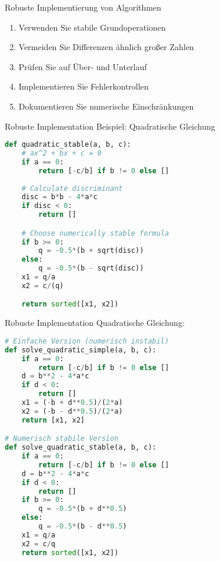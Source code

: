 \begin{KR}{Robuste Implementierung von Algorithmen}
\begin{enumerate}
    \item Verwenden Sie stabile Grundoperationen
    \item Vermeiden Sie Differenzen ähnlich großer Zahlen
    \item Prüfen Sie auf Über- und Unterlauf
    \item Implementieren Sie Fehlerkontrollen
    \item Dokumentieren Sie numerische Einschränkungen
\end{enumerate}
\end{KR}

\begin{examplecode}{Robuste Implementation} Beispiel: Quadratische Gleichung
\begin{lstlisting}[language=Python, style=basesmol]
def quadratic_stable(a, b, c):
    # ax^2 + bx + c = 0
    if a == 0:
        return [-c/b] if b != 0 else []
        
    # Calculate discriminant
    disc = b*b - 4*a*c
    if disc < 0:
        return []

    # Choose numerically stable formula
    if b >= 0:
        q = -0.5*(b + sqrt(disc))
    else:
        q = -0.5*(b - sqrt(disc))
    x1 = q/a
    x2 = c/(q)

    return sorted([x1, x2])
\end{lstlisting}
\end{examplecode}

\begin{examplecode}{Robuste Implementation} Quadratische Gleichung:
\begin{lstlisting}[language=Python, style=basesmol]
# Einfache Version (numerisch instabil)
def solve_quadratic_simple(a, b, c):
    if a == 0:
        return [-c/b] if b != 0 else []
    d = b**2 - 4*a*c
    if d < 0:
        return []
    x1 = (-b + d**0.5)/(2*a)
    x2 = (-b - d**0.5)/(2*a)
    return [x1, x2]

# Numerisch stabile Version
def solve_quadratic_stable(a, b, c):
    if a == 0:
        return [-c/b] if b != 0 else []
    d = b**2 - 4*a*c
    if d < 0:
        return []
    if b >= 0:
        q = -0.5*(b + d**0.5)
    else:
        q = -0.5*(b - d**0.5)
    x1 = q/a
    x2 = c/q
    return sorted([x1, x2])
\end{lstlisting}
\end{examplecode}
